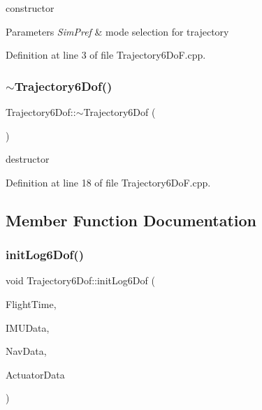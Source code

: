 constructor 


\begin{DoxyParams}{Parameters}
{\em Sim\+Pref} & mode selection for trajectory \\
\hline
\end{DoxyParams}


Definition at line 3 of file Trajectory6\+Do\+F.\+cpp.

\mbox{\label{class_trajectory6_dof_a6bccf2060b63851fcc039ca1efb6f378}} 
\subsubsection{\texorpdfstring{$\sim$\+Trajectory6\+Dof()}{~Trajectory6Dof()}}
{\footnotesize\ttfamily Trajectory6\+Dof\+::$\sim$\+Trajectory6\+Dof (\begin{DoxyParamCaption}{ }\end{DoxyParamCaption})}



destructor 



Definition at line 18 of file Trajectory6\+Do\+F.\+cpp.



\subsection{Member Function Documentation}
\mbox{\label{class_trajectory6_dof_ad0695ba90c621c01a6abc0da03fd8329}} 
\subsubsection{\texorpdfstring{init\+Log6\+Dof()}{initLog6Dof()}}
{\footnotesize\ttfamily void Trajectory6\+Dof\+::init\+Log6\+Dof (\begin{DoxyParamCaption}\item[{\hyperlink{group___tools_ga3f1431cb9f76da10f59246d1d743dc2c}{Float64} \&}]{Flight\+Time,  }\item[{I\+M\+U\+Struct \&}]{I\+M\+U\+Data,  }\item[{Navigation\+Struct \&}]{Nav\+Data,  }\item[{Actuator\+Struct \&}]{Actuator\+Data }\end{DoxyParamCaption})}



